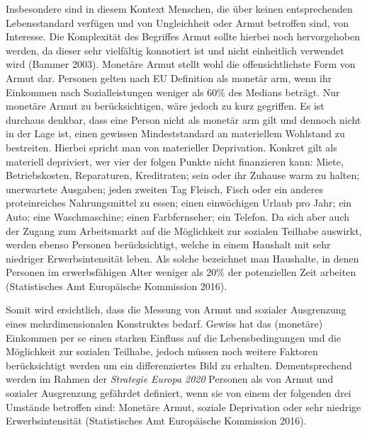 \documentclass[12pt,]{article}
\begin{document}
Insbesondere sind in diesem Kontext Menschen, die über keinen
entsprechenden Lebensstandard verfügen und von Ungleichheit oder Armut
betroffen sind, von Interesse. Die Komplexität des Begriffes Armut
sollte hierbei noch hervorgehoben werden, da dieser sehr vielfältig
konnotiert ist und nicht einheitlich verwendet wird (Bammer 2003).
Monetäre Armut stellt wohl die offensichtlichste Form von Armut dar.
Personen gelten nach EU Definition als monetär arm, wenn ihr Einkommen
nach Sozialleistungen weniger als 60\% des Medians beträgt. Nur monetäre
Armut zu berücksichtigen, wäre jedoch zu kurz gegriffen. Es ist durchaus
denkbar, dass eine Person nicht als monetär arm gilt und dennoch nicht
in der Lage ist, einen gewissen Mindeststandard an materiellem Wohlstand
zu bestreiten. Hierbei spricht man von materieller Deprivation. Konkret
gilt als materiell depriviert, wer vier der folgen Punkte nicht
finanzieren kann: Miete, Betriebskosten, Reparaturen, Kreditraten; sein
oder ihr Zuhause warm zu halten; unerwartete Ausgaben; jeden zweiten Tag
Fleisch, Fisch oder ein anderes proteinreiches Nahrungsmittel zu essen;
einen einwöchigen Urlaub pro Jahr; ein Auto; eine Waschmaschine; einen
Farbfernseher; ein Telefon. Da sich aber auch der Zugang zum
Arbeitsmarkt auf die Möglichkeit zur sozialen Teilhabe auswirkt, werden
ebenso Personen berücksichtigt, welche in einem Haushalt mit sehr
niedriger Erwerbsintensität leben. Als solche bezeichnet man Haushalte,
in denen Personen im erwerbsfähigen Alter weniger als 20\% der
potenziellen Zeit arbeiten (Statistisches Amt Europäische Kommission
2016).

Somit wird ersichtlich, dass die Messung von Armut und sozialer
Ausgrenzung eines mehrdimensionalen Konstruktes bedarf. Gewiss hat das
(monetäre) Einkommen per se einen starken Einfluss auf die
Lebensbedingungen und die Möglichkeit zur sozialen Teilhabe, jedoch
müssen noch weitere Faktoren berücksichtigt werden um ein
differenziertes Bild zu erhalten. Dementsprechend werden im Rahmen der
\emph{Strategie Europa 2020} Personen als von Armut und sozialer
Ausgrenzung gefährdet definiert, wenn sie von einem der folgenden drei
Umstände betroffen sind: Monetäre Armut, soziale Deprivation oder sehr
niedrige Erwerbsintensität (Statistisches Amt Europäische Kommission
2016).
\end{document}
